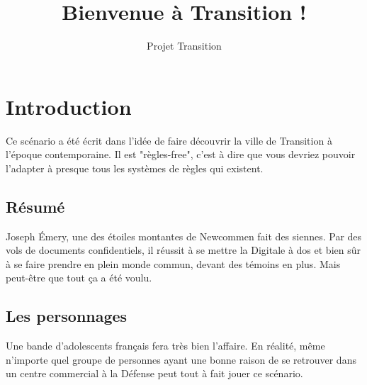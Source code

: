 \documentclass[10pt,a4paper,twocolumn]{article}
\author{Projet Transition}
\title{Bienvenue à Transition !}
\begin{document}
\maketitle
\section{Introduction}
Ce scénario a été écrit dans l'idée de faire découvrir la ville de Transition à l'époque contemporaine. Il est "règles-free", c'est à dire que vous devriez pouvoir l'adapter à presque tous les systèmes de règles qui existent.
\subsection{Résumé}
Joseph Émery, une des étoiles montantes de Newcommen fait des siennes. Par des vols de documents confidentiels, il réussit à se mettre la Digitale à dos et bien sûr à se faire prendre en plein monde commun, devant des témoins en plus. Mais peut-être que tout ça a été voulu.
\subsection{Les personnages}
Une bande d'adolescents français fera très bien l'affaire. En réalité, même n'importe quel groupe de personnes ayant une bonne raison de se retrouver dans un centre commercial à la Défense peut tout à fait jouer ce scénario.
\end{document}
